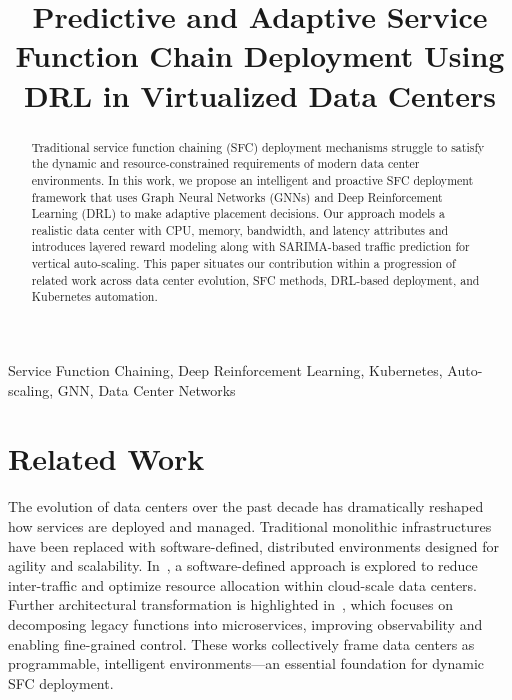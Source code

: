 \documentclass[conference]{IEEEtran}
\begin{document}
\title{Predictive and Adaptive Service Function Chain Deployment Using DRL in Virtualized Data Centers}

\author{
}

\maketitle

\begin{abstract}
Traditional service function chaining (SFC) deployment mechanisms struggle to satisfy the dynamic and resource-constrained requirements of modern data center environments. In this work, we propose an intelligent and proactive SFC deployment framework that uses Graph Neural Networks (GNNs) and Deep Reinforcement Learning (DRL) to make adaptive placement decisions. Our approach models a realistic data center with CPU, memory, bandwidth, and latency attributes and introduces layered reward modeling along with SARIMA-based traffic prediction for vertical auto-scaling. This paper situates our contribution within a progression of related work across data center evolution, SFC methods, DRL-based deployment, and Kubernetes automation.
\end{abstract}

\begin{IEEEkeywords}
Service Function Chaining, Deep Reinforcement Learning, Kubernetes, Auto-scaling, GNN, Data Center Networks
\end{IEEEkeywords}

\section{Related Work}

The evolution of data centers over the past decade has dramatically reshaped how services are deployed and managed. Traditional monolithic infrastructures have been replaced with software-defined, distributed environments designed for agility and scalability. In~\cite{datacenter1}, a software-defined approach is explored to reduce inter-traffic and optimize resource allocation within cloud-scale data centers. Further architectural transformation is highlighted in~\cite{datacenter2}, which focuses on decomposing legacy functions into microservices, improving observability and enabling fine-grained control. These works collectively frame data centers as programmable, intelligent environments—an essential foundation for dynamic SFC deployment.
\end{document}
